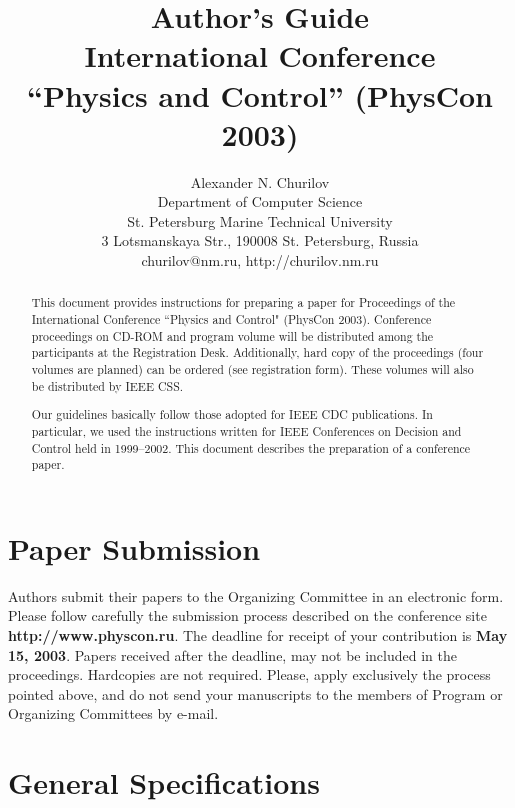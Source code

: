 \documentclass{physcon}
\begin{document}
\title{Author's Guide\\
International Conference\\
``Physics and Control'' (PhysCon 2003)
}

\author{Alexander N. Churilov\\                               
Department of Computer Science\\
St. Petersburg Marine Technical University\\
3 Lotsmanskaya Str.,
190008 St. Petersburg, Russia\\
churilov@nm.ru, http://churilov.nm.ru}
\maketitle

\begin{abstract}
This document provides instructions for 
preparing a paper for Proceedings of the 
International Conference 
``Physics and Control" (PhysCon 2003).
Conference proceedings on CD-ROM and program volume will
be distributed among the participants at the Registration Desk. 
Additionally, hard copy of the proceedings (four volumes are planned) 
can be ordered (see registration form). 
These volumes will also be distributed by IEEE CSS.

Our guidelines basically follow those adopted for IEEE CDC 
publications. In particular, we used the instructions      
written for IEEE Conferences on 
Decision and Control held in 1999--2002.
This document describes the preparation of a conference 
paper. 
\end{abstract}

\section{Paper Submission}

Authors submit their papers to the 
Organizing Committee in an electronic form.
Please follow carefully the submission process described
on the conference site {\bf http://www.physcon.ru}.
The deadline for receipt of your contribution 
is {\bf May 15, 2003}.  
Papers received after the deadline, may not be 
included in the proceedings. 
Hardcopies are not required. 
Please, apply exclusively the process pointed above, and 
do not send your manuscripts to the members
of Program or Organizing Committees by e-mail.

\section{General Specifications}
\end{document}
